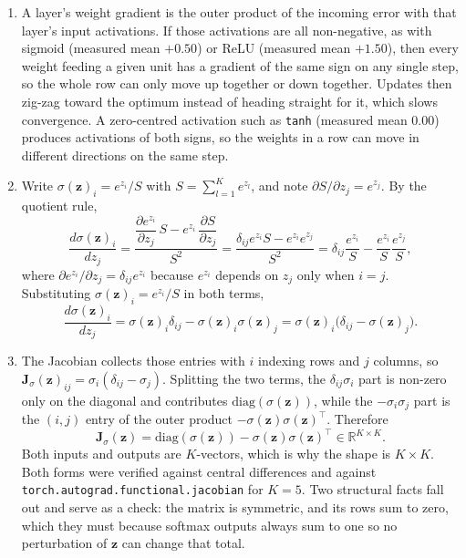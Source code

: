 \documentclass[11pt]{article}
\begin{document}
\begin{enumerate}
  \item A layer's weight gradient is the outer product of the incoming error with that layer's input
        activations. If those activations are all non-negative, as with sigmoid (measured mean $+0.50$) or
        ReLU (measured mean $+1.50$), then every weight feeding a given unit has a gradient of the same
        sign on any single step, so the whole row can only move up together or down together. Updates then
        zig-zag toward the optimum instead of heading straight for it, which slows convergence. A
        zero-centred activation such as \texttt{tanh} (measured mean $0.00$) produces activations of both
        signs, so the weights in a row can move in different directions on the same step.

  \item Write $\sigma(\mathbf{z})_i = e^{z_i} / S$ with $S = \sum_{l=1}^{K} e^{z_l}$, and note
        $\partial S/\partial z_j = e^{z_j}$. By the quotient rule,
        \[
          \frac{d\sigma(\mathbf{z})_i}{dz_j}
          = \frac{\dfrac{\partial e^{z_i}}{\partial z_j}\, S - e^{z_i}\, \dfrac{\partial S}{\partial z_j}}{S^2}
          = \frac{\delta_{ij} e^{z_i} S - e^{z_i} e^{z_j}}{S^2}
          = \delta_{ij}\frac{e^{z_i}}{S} - \frac{e^{z_i}}{S}\frac{e^{z_j}}{S},
        \]
        where $\partial e^{z_i}/\partial z_j = \delta_{ij} e^{z_i}$ because $e^{z_i}$ depends on $z_j$ only
        when $i = j$. Substituting $\sigma(\mathbf{z})_i = e^{z_i}/S$ in both terms,
        \[
          \frac{d\sigma(\mathbf{z})_i}{dz_j}
          = \sigma(\mathbf{z})_i \delta_{ij} - \sigma(\mathbf{z})_i \sigma(\mathbf{z})_j
          = \sigma(\mathbf{z})_i\big(\delta_{ij} - \sigma(\mathbf{z})_j\big).
        \]

  \item The Jacobian collects those entries with $i$ indexing rows and $j$ columns, so
        $\mathbf{J}_\sigma(\mathbf{z})_{ij} = \sigma_i(\delta_{ij} - \sigma_j)$. Splitting the two terms,
        the $\delta_{ij}\sigma_i$ part is non-zero only on the diagonal and contributes
        $\mathrm{diag}(\sigma(\mathbf{z}))$, while the $-\sigma_i \sigma_j$ part is the $(i,j)$ entry of the
        outer product $-\sigma(\mathbf{z})\sigma(\mathbf{z})^\top$. Therefore
        \[
          \mathbf{J}_\sigma(\mathbf{z}) = \mathrm{diag}(\sigma(\mathbf{z}))
            - \sigma(\mathbf{z})\sigma(\mathbf{z})^\top \in \mathbb{R}^{K \times K}.
        \]
        Both inputs and outputs are $K$-vectors, which is why the shape is $K \times K$. Both forms were verified against central differences and against
        \texttt{torch.autograd.functional.jacobian} for $K = 5$.
        Two structural facts fall out and serve as a check: the matrix is symmetric, and its rows sum to
        zero, which they must because softmax outputs always sum to one so no perturbation of $\mathbf{z}$
        can change that total.
\end{enumerate}
\end{document}
